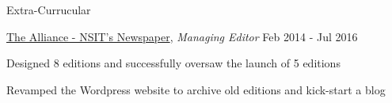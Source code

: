 \documentclass{resume} %
\begin{document}

        



\begin{rSection}{Extra-Currucular} \itemsep -3pt

    \begin{rSubsection}
        {\href{http://alliancensit.com/our-editions/}{The Alliance - NSIT's Newspaper}, {\normalfont \em Managing Editor}}
            {Feb 2014 - Jul 2016}
        {}{}
        
        \item Designed 8 editions and successfully oversaw the launch of 5 editions
        \item Revamped the Wordpress website to archive old editions and kick-start a blog
    \end{rSubsection}




\end{rSection}
\end{document}
